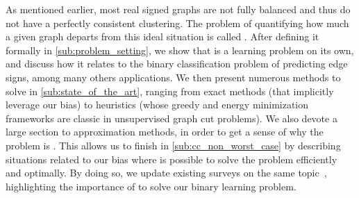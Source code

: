 
As mentioned earlier, most real signed graphs are not fully balanced and thus do not have a
perfectly consistent clustering. The problem of quantifying how much a given graph departs from this
ideal situation is called \pcc{}. After defining it formally in \autoref{sub:problem_setting}, we
show that \pcc{} is a learning problem on its own, and discuss how it relates to the binary
classification problem of predicting edge signs, among many others applications. We then present
numerous methods to solve \pcc{} in \autoref{sub:state_of_the_art}, ranging from exact methods (that
implicitly leverage our bias) to heuristics (whose greedy and energy minimization frameworks are
classic in unsupervised graph cut problems). We also devote a large section to approximation
methods, in order to get a sense of why the problem is \NPc{}. This allows us to finish in
\autoref{sub:cc_non_worst_case} by describing situations related to our bias where is possible to
solve the problem efficiently and optimally. By doing so, we update existing surveys on the same
topic~\autocites{bonchi2014correlation}{surveyCC16}{CCWirth2017}, highlighting the importance of
\pcc{} to solve our binary learning problem.


